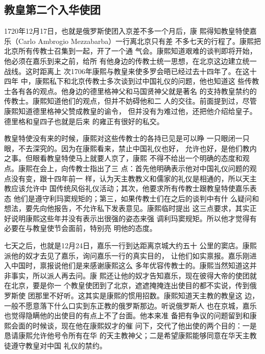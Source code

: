 \subsection{教皇第二个入华使团}
\par
1720年12月17日，也就是俄罗斯使团入京差不多一个月后，康%
熙得知教皇特使嘉乐（Carlo Ambrogio Mezzabarba）一行离北京只有差%
不多七天的行程了。康熙把北京所有传教士召集到一起，开了一个通%
气会。康熙知道艰难的谈判即将开始，他必须在嘉乐到来之前，给所%
有他身边的传教士统一思想，在北京这边建立统一战线。这时距离上%
次1706年康熙与教皇来使多罗会晤已经过去十四年了。在这十四年%
中，康熙私下和北京传教士多次谈到过中国礼仪的问题，他也知道这%
些传教士各有各的观点。他身边的德里格神父和马国贤神父就是著名%
的支持教皇禁约的传教士。康熙知道他们的观点，但并不妨碍他和二%
人的交往。前面提到过，尽管康熙知道德里格神父赞成教皇的谕令，%
但并没有为难过他，还把他介绍给皇子。德里格和皇四子也就是后来%
的雍正有很好的私交。%
\par
教皇特使没有来的时候，康熙对这些传教士的各持已见是可以睁%
一只眼闭一只眼，不去深究的。因为在康熙看来，禁止中国礼仪也好，%
允许也好，是他们教内之事。但眼看教皇特使马上就要人京了，康熙%
不得不给出一个明确的态度和观点。康熙在会上，向传教士指出了三%
点：首先他明确表示他对中国礼仪问题的观点没有变，跟十四年前一%
样，认为天主教教义和儒家的礼仪是相通的，所以天主教应该允许中%
国传统风俗礼仪活动；其次，他要求所有传教士跟教皇特使嘉乐表态%
他们是遵守利玛窦规矩的；第三，如果传教士们在之后的谈判中有什%
么疑问和想法，要先向他报告，不允许私下发表意见。康熙临时提出%
这三点要求，其实正好说明康熙这些年并没有表示出很强的姿态来强%
调利玛窦规矩。所以他才觉得有必要在与教皇使节会面前，特别亮%
明他的态度。%
\par
七天之后，也就是12月24日，嘉乐一行到达距离京城大约五十%
公里的窦店。康熙派他的奴才去见了嘉乐，询问嘉乐一行的真实目的，%
让他们如实禀报。嘉乐刚进入中国时，禀报说他们是来感谢康熙这么%
多年优容传教士的。康熙当然知道这并非事实，所以派人再去问。康%
熙还让他的奴才告知嘉乐，现在彼得大帝的使团就在北京，要是你一%
个教皇使团到了北京，遮遮掩掩连出使目的都不实说，传到俄罗斯使%
团那里不好听。这其实是康熙的惯用招数。康熙知道天主教的教皇这%
边，一般不愿意落下什么口实到东正教的俄罗斯那边。听说俄罗斯人%
也在京城，嘉乐也觉得隐瞒他的出使目的有点上不了台面。他本来准%
备把有争议的问题留到和康熙会面的时候谈，现在他在康熙奴才的催%
问下，交代了他出使的两个目的：一是恳请康熙允许他号令所有在华%
的天主教神父；二是希望康熙能够同意在华天主教徒遵守教皇对中国%
礼仪的禁约。%
